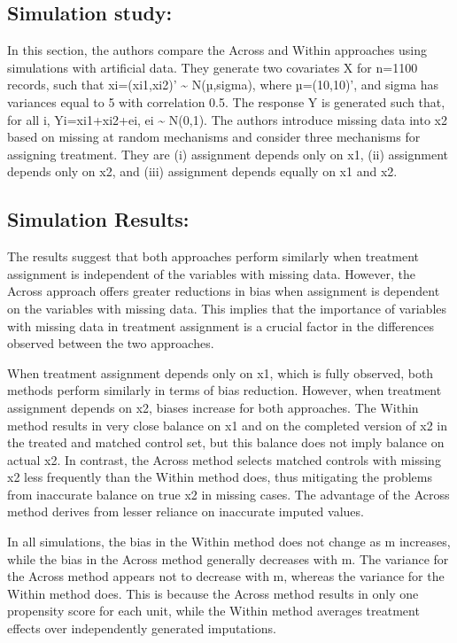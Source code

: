 \documentclass{article}
\begin{document}
\hypertarget{simulation-study}{%
\subsection{Simulation study:}\label{simulation-study}}

In this section, the authors compare the Across and Within approaches
using simulations with artificial data. They generate two covariates X
for n=1100 records, such that xi=(xi1,xi2)' \textasciitilde{}
N(µ,sigma), where µ=(10,10)', and sigma has variances equal to 5 with
correlation 0.5. The response Y is generated such that, for all i,
Yi=xi1+xi2+ei, ei \textasciitilde{} N(0,1). The authors introduce
missing data into x2 based on missing at random mechanisms and consider
three mechanisms for assigning treatment. They are (i) assignment
depends only on x1, (ii) assignment depends only on x2, and (iii)
assignment depends equally on x1 and x2.

\hypertarget{simulation-results}{%
\subsection{Simulation Results:}\label{simulation-results}}

The results suggest that both approaches perform similarly when
treatment assignment is independent of the variables with missing data.
However, the Across approach offers greater reductions in bias when
assignment is dependent on the variables with missing data. This implies
that the importance of variables with missing data in treatment
assignment is a crucial factor in the differences observed between the
two approaches.

When treatment assignment depends only on x1, which is fully observed,
both methods perform similarly in terms of bias reduction. However, when
treatment assignment depends on x2, biases increase for both approaches.
The Within method results in very close balance on x1 and on the
completed version of x2 in the treated and matched control set, but this
balance does not imply balance on actual x2. In contrast, the Across
method selects matched controls with missing x2 less frequently than the
Within method does, thus mitigating the problems from inaccurate balance
on true x2 in missing cases. The advantage of the Across method derives
from lesser reliance on inaccurate imputed values.

In all simulations, the bias in the Within method does not change as m
increases, while the bias in the Across method generally decreases with
m. The variance for the Across method appears not to decrease with m,
whereas the variance for the Within method does. This is because the
Across method results in only one propensity score for each unit, while
the Within method averages treatment effects over independently
generated imputations.
\end{document}
